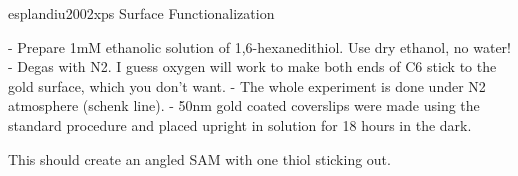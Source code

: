 esplandiu2002xps
Surface Functionalization

- Prepare 1mM ethanolic solution of 1,6-hexanedithiol.  Use dry ethanol, no
 water!
 - Degas with N2.  I guess oxygen will work to make both ends of C6 stick
 to
  the gold surface, which you don't want.
  -  The whole experiment is done under N2 atmosphere (schenk line).
  - 50nm gold coated coverslips were made using the standard procedure and
   placed upright in solution for 18 hours in the dark.

   This should create an angled SAM with one thiol sticking out.
